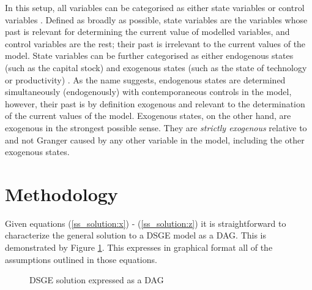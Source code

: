 \documentclass{article}
\begin{document}
In this setup, all variables can be categorised as either state variables or control variables \parencite{fernandez2016solution}. Defined as broadly as possible, state variables are the variables whose past is relevant for determining the current value of modelled variables, and control variables are the rest; their past is irrelevant to the current values of the model. State variables can be further categorised as either endogenous states (such as the capital stock) and exogenous states (such as the state of technology or productivity) \parencite{ravenna2007vector}. As the name suggests, endogenous states are determined simultaneously (endogenously) with contemporaneous controls in the model, however, their past is by definition exogenous and relevant to the determination of the current values of the model. Exogenous states, on the other hand, are exogenous in the strongest possible sense. They are \textit{strictly exogenous} relative to and not Granger caused by any other variable in the model, including the other exogenous states.

\section{Methodology} \label{methodology}

Given equations (\ref{ss_solution:x}) - (\ref{ss_solution:z}) it is straightforward to characterize the general solution to a DSGE model as a DAG. This is demonstrated by Figure \ref{dsge_dag}. This expresses in graphical format all of the assumptions outlined in those equations. 

\begin{figure}
  \centering
  \caption{DSGE solution expressed as a DAG}
  \label{dsge_dag}
\end{figure}
\end{document}
